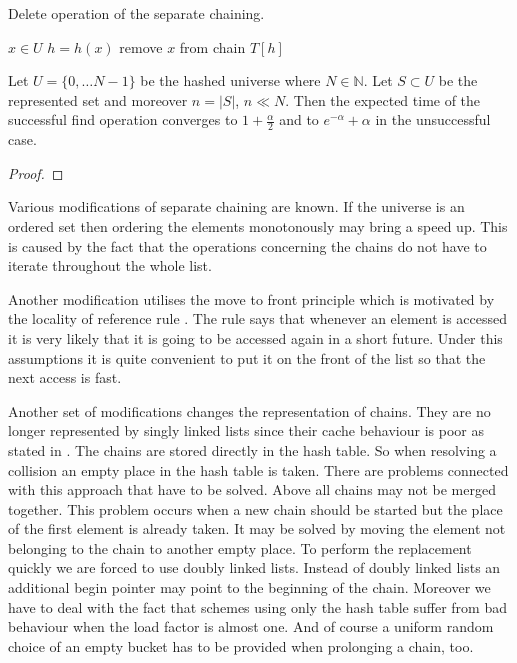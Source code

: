 \begin{algorithm}
\caption{Delete operation of the separate chaining.}
\label{algorithm-delete-separate-chaining}
\begin{algorithmic}
\REQUIRE $x \in U$
\STATE $h = h(x)$
\STATE
{}
	\STATE remove $x$ from chain $T[h]$
\ENDIF
\end{algorithmic}
\end{algorithm}

\begin{theorem}
Let $U = \{0, \dots N - 1\}$ be the hashed universe where $N \in \mathbb{N}$. Let $S \subset U$ be the represented set and moreover $n = |S|$, $n \ll N$. Then the expected time of the successful find operation converges to $1 + \frac{\alpha}{2}$ and to $e^{-\alpha} + \alpha$ in the unsuccessful case.
\end{theorem}
\begin{proof}

\end{proof}

Various modifications of separate chaining are known. If the universe is an ordered set then ordering the elements monotonously may bring a speed up. This is caused by the fact that the operations concerning the chains do not have to iterate throughout the whole list. 

Another modification utilises the move to front principle \cite{723912} which is motivated by the locality of reference rule \cite{DBLP:books/aw/AhoSU86}. The rule says that whenever an element is accessed it is very likely that it is going to be accessed again in a short future. Under this assumptions it is quite convenient to put it on the front of the list so that the next access is fast.

Another set of modifications changes the representation of chains. They are no longer represented by singly linked lists since their cache behaviour \cite{1200662} is poor as stated in \cite{Rubin99virtualcache}. The chains are stored directly in the hash table. So when resolving a collision an empty place in the hash table is taken. There are problems connected with this approach that have to be solved. Above all chains may not be merged together. This problem occurs when a new chain should be started but the place of the first element is already taken. It may be solved by moving the element not belonging to the chain to another empty place. To perform the replacement quickly we are forced to use doubly linked lists. Instead of doubly linked lists an additional begin pointer may point to the beginning of the chain. Moreover we have to deal with the fact that schemes using only the hash table suffer from bad behaviour when the load factor is almost one. And of course a uniform random choice of an empty bucket has to be provided when prolonging a chain, too.

